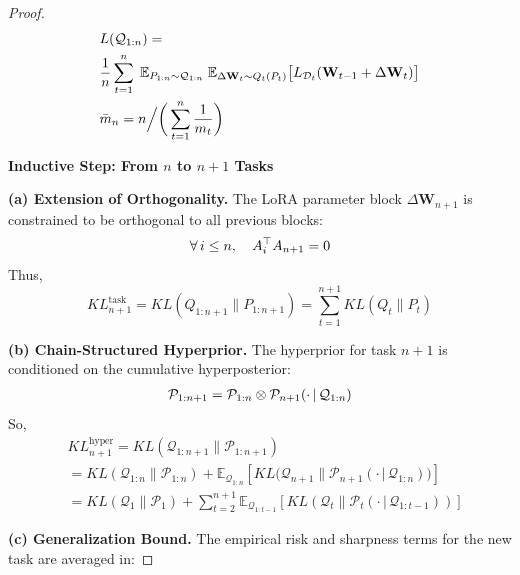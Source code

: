 \documentclass[letterpaper]{article} %
\begin{document}
\begin{proof}
\begin{align}
&L(\mathcal{Q}_{1:n}) = \notag\\
& \frac{1}{n} \sum_{t=1}^n\;
    \mathbb{E}_{P_{1:n} \sim \mathcal{Q}_{1:n}}\;
    \mathbb{E}_{\Delta\mathbf{W}_t \sim Q_t(P_t)}
    \big[
        L_{\mathcal{D}_t}(\mathbf{W}_{t-1} + \Delta\mathbf{W}_t)
    \big] \notag \\
&\bar{m}_n =
    n \Big/ \bigg( \sum_{t=1}^n \frac{1}{m_t} \bigg) \notag
\end{align}




\textbf{Inductive Step: From $n$ to $n+1$ Tasks}


\textbf{(a) Extension of Orthogonality.}
The LoRA parameter block $\Delta\mathbf{W}_{n+1}$ is constrained to be orthogonal to all previous blocks:
    \begin{align}
        \forall\, i \leq n, \quad A_i^\top A_{n+1} = 0 \notag
    \end{align}
    Thus,
    \begin{equation}
        KL^{\text{task}}_{n+1}=KL(Q_{1:n+1} \| P_{1:n+1}) = \sum_{t=1}^{n+1} KL(Q_t \| P_t)
    \end{equation}

\textbf{(b) Chain-Structured Hyperprior.}
    The hyperprior for task $n+1$ is conditioned on the cumulative hyperposterior:
    \begin{align}
        \mathcal{P}_{1:n+1} = \mathcal{P}_{1:n} \otimes \mathcal{P}_{n+1}(\cdot\,|\,\mathcal{Q}_{1:n}) \notag
    \end{align}
    So,
    \begin{equation}
        \begin{aligned}
        &KL^{\text{hyper}}_{n+1}
        =KL(\mathcal{Q}_{1:n+1} \| \mathcal{P}_{1:n+1}) \\
        &= KL(\mathcal{Q}_{1:n} \| \mathcal{P}_{1:n}) +\mathbb{E}_{\mathcal{Q}_{1:n}}\left[ KL\big(\mathcal{Q}_{n+1} \| \mathcal{P}_{n+1}(\cdot\,|\,\mathcal{Q}_{1:n})\big) \right] 
        \\
        &= KL(\mathcal{Q}_1 \| \mathcal{P}_1) +
         \sum_{t=2}^{n+1} \mathbb{E}_{\mathcal{Q}_{1:t-1}}\left[ KL\left(\mathcal{Q}_t \| \mathcal{P}_t(\cdot\,|\,\mathcal{Q}_{1:t-1})\right) \right]
    \end{aligned}
    \end{equation}


\textbf{(c) Generalization Bound.}
    The empirical risk and sharpness terms for the new task are averaged in:


\end{proof}
\end{document}
